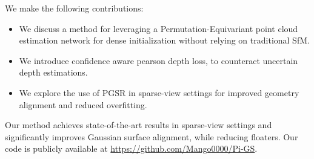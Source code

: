 We make the following contributions:
\begin{itemize}
    \item We discuss a method for leveraging a Permutation-Equivariant point cloud estimation network for dense initialization without relying on traditional SfM.
    \item We introduce confidence aware pearson depth loss, to counteract uncertain depth estimations.
    \item We explore the use of PGSR in sparse-view settings for improved geometry alignment and reduced overfitting.
\end{itemize}
Our method achieves state-of-the-art results in sparse-view settings and significantly improves Gaussian surface alignment, while reducing floaters.
Our code is publicly available at \href{https://github.com/Mango0000/Pi-GS}{https://github.com/Mango0000/Pi-GS}.